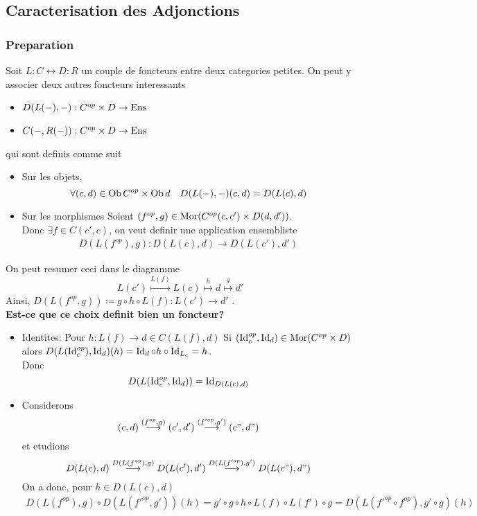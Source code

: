 \documentclass[../main.tex]{subfiles}
\begin{document}
\subsection{Caracterisation des Adjonctions}
\subsubsection{Preparation}
Soit $L:C \leftrightarrow D:R$ un couple de foncteurs entre deux categories petites. On peut y associer deux autres foncteurs interessants
\begin{itemize}
	\item $D( L( -) ,-) : C^{op}\times D \to \operatorname{Ens}$ 
	\item $C( -, R( -) ): C^{op}\times D  \to \operatorname{Ens}$ 
\end{itemize}
qui sont definis comme suit
\begin{itemize}
\item Sur les objets, 
	\[ 
		\forall ( c,d)  \in \operatorname{Ob} C^{op}\times \operatorname{Ob} d \quad D( L( -) ,-) ( c,d) = D( L( c) , d) 
	\]

\item Sur les morphismes
	Soient $( f^{op}, g) \in \operatorname{Mor} ( C^{op}( c,c') \times D( d,d') ) $.\\
	Donc $\exists f \in C( c',c)  $, on veut definir une application ensembliste
	\begin{align*}
	D( L( f^{op}) ,g) : D( L( c) ,d) \to D( L( c') ,d') 	
	\end{align*}

	
	
\end{itemize}
On peut resumer ceci dans le diagramme
\[ 
	L( c') \overset { L( f) } { \longmapsto} L( c) \overset { h} { \longmapsto} d \overset { g} { \longmapsto} d'
\]
Ainsi, $D( L( f^{op},g) ) \coloneqq g\circ h \circ L( f) : L( c') \to d'$ .\\
\textbf{ Est-ce que ce choix definit bien un foncteur?} \\
\begin{itemize}
	\item Identites: Pour $h:L( f) \to d\in C( L( f) ,d) $ Si $( \operatorname{Id}_c^{op},\operatorname{Id}_d) \in \operatorname{Mor} ( C^{op}\times D) $ alors $D( L( \operatorname{Id}_c^{op}) ,\operatorname{Id}_d) ( h ) = \operatorname{Id}_d\circ h\circ \operatorname{Id}_{L_c}=h $.\\
		Donc
		\[ 
			D( L( \operatorname{Id}_c^{op},\operatorname{Id}_d) ) =\operatorname{Id}_{D( L( c) ,d) } 
		\]
	
	\item Considerons 
		\[ 
			( c,d) \overset { ( f^{op},g) } { \longrightarrow} ( c',d') \overset { ( f'^{op},g') } { \longrightarrow} ( c",d") 
		\]
		et etudions
		\[ 
			D( L( c ),d) \overset {   D(L( f^{op}),g) } { \longrightarrow} D( L( c' ),d') \overset { D( L( f'^{op} ),g') } { \longrightarrow} D(L(  c" ),d") 
		\]
		On a donc, pour $h \in D( L( c) ,d) $ 
		\begin{align*}
			D( L( f^{op}) ,g)\circ D( L( f'^{op},g') ) ( h) = g'\circ g\circ h \circ L( f)\circ L( f')   \circ g = D( L( f'^{op}\circ f^{op}), g'\circ g) ( h) 
		\end{align*}

		
		
\end{itemize}
\end{document}
